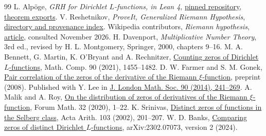 \documentclass[11pt,letterpaper]{article}
\begin{document}
\begin{thebibliography}{99}\small
{} L. Alp\"oge, \emph{GRH for Dirichlet $L$-functions, in Lean 4},
\href{https://github.com/lsernau/grh-lean/tree/72fead102f663d5c7a407964a13dc0cf9d977207}{pinned repository},
\href{https://github.com/lsernau/grh-lean/blob/72fead102f663d5c7a407964a13dc0cf9d977207/grh/src/Main.lean}{theorem exports}.
 V. Reshetnikov, \emph{ProveIt, Generalized Riemann Hypothesis},
\href{https://github.com/VladimirReshetnikov/ProveIt/tree/2c45d198070f93209d6f0faa2d387ef0a2c4e72c/Analysis/GeneralizedRiemannHypothesis}{directory and provenance index}.
 Wikipedia contributors, \emph{Riemann hypothesis},
\href{https://en.wikipedia.org/wiki/Riemann_hypothesis}{article}, consulted November 2026.
 H. Davenport, \emph{Multiplicative Number Theory}, 3rd ed.,
revised by H. L. Montgomery, Springer, 2000, chapters 9--16.
 M. A. Bennett, G. Martin, K. O'Bryant and A. Rechnitzer,
\href{https://doi.org/10.1090/mcom/3599}{Counting zeros of Dirichlet $L$-functions},
Math. Comp. 90 (2021), 1455--1482.
 D. W. Farmer and S. M. Gonek,
\href{https://arxiv.org/abs/0803.0425}{Pair correlation of the zeros of the derivative of the Riemann $\xi$-function}, preprint (2008). Published with Y. Lee in \href{https://doi.org/10.1112/jlms/jdu026}{J. London Math. Soc. 90 (2014), 241--269}.
 A. Malik and A. Roy,
\href{https://doi.org/10.1515/forum-2018-0081}{On the distribution of zeros of derivatives of the Riemann $\xi$-function}, Forum Math. 32 (2020), 1--22.
 K. Srinivas,
\href{https://www.imsc.res.in/~srini/publication/recent/selberg.pdf}{Distinct zeros of functions in the Selberg class}, Acta Arith. 103 (2002), 201--207.
 W. D. Banks,
\href{https://arxiv.org/abs/2302.07073}{Comparing zeros of distinct Dirichlet $L$-functions}, arXiv:2302.07073, version 2 (2024).
\end{thebibliography}
\end{document}
